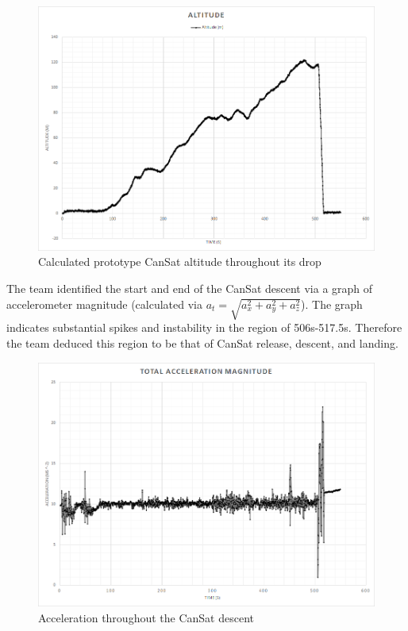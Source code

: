 \documentclass[]{report}
\begin{document}
	\begin{figure}[h]
	\hfill\includegraphics[scale=0.7]{altitude.png}\hspace*{\fill}
	\caption{Calculated prototype CanSat altitude throughout its drop}
	\label{palt}
	\end{figure}
	
	The team identified the start and end of the CanSat descent via a graph of accelerometer magnitude (calculated via $a_t = \sqrt{a_x^2 + a_y^2 + a_z^2}$). The graph indicates substantial spikes and instability in the region of 506s-517.5s. Therefore the team deduced this region to be that of CanSat release, descent, and landing.
	
	\begin{figure}[h]
		\hfill\includegraphics[scale=0.7]{accel_mag.png}\hspace*{\fill}
		\caption{Acceleration throughout the CanSat descent}
		\label{accel}
	\end{figure}
	
\end{document}
